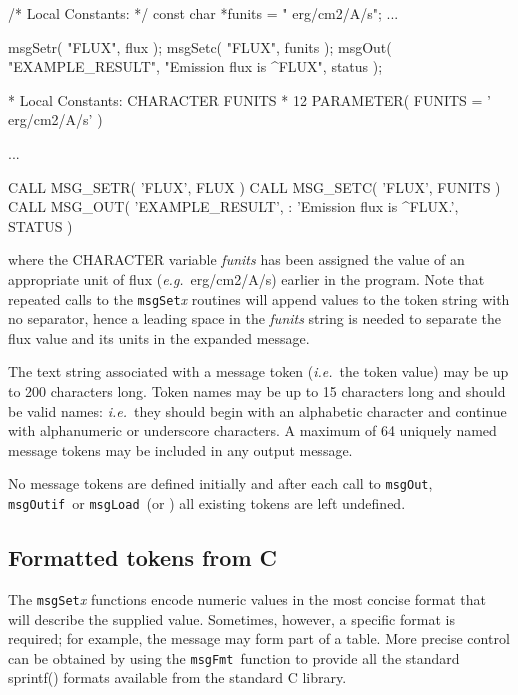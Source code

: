 \documentclass[twoside,11pt]{starlink}
\providecommand{\func}[1]{\texttt{#1}}
\providecommand{\farg}[1]{\textit{#1}}
\providecommand{\msgfmt}{\func{msgFmt}}
\providecommand{\msgload}{\func{msgLoad}}
\providecommand{\msgout}{\func{msgOut}}
\providecommand{\msgoutif}{\func{msgOutif}}
\begin{document}
\begin {small}
\begin{terminalv}
/* Local Constants: */
      const char *funits = " erg/cm2/A/s";
      ...

      msgSetr( "FLUX", flux );
      msgSetc( "FLUX", funits );
      msgOut( "EXAMPLE_RESULT",
              "Emission flux is ^FLUX", status );

*  Local Constants:
      CHARACTER FUNITS * 12
      PARAMETER( FUNITS = ' erg/cm2/A/s' )

      ...

      CALL MSG_SETR( 'FLUX', FLUX )
      CALL MSG_SETC( 'FLUX', FUNITS )
      CALL MSG_OUT( 'EXAMPLE_RESULT',
     :             'Emission flux is ^FLUX.', STATUS )
\end{terminalv}
\end {small}

where the CHARACTER variable \farg{funits} has been assigned the value of an
appropriate unit of flux (\textit{e.g.}\ erg/cm2/A/s) earlier in the program.
Note that repeated calls to the \func{msgSet}\textit{x} routines will append values
to the token string with no separator, hence a leading space in the \farg{funits}
string is needed to separate the flux value and its units in the expanded
message.

The text string associated with a message token (\textit{i.e.}\ the token value)
may be up to 200 characters long.
Token names may be up to 15 characters long and should be valid names:
\textit{i.e.}\ they should begin with an alphabetic character and continue with
alphanumeric or underscore characters.
A maximum of 64 uniquely named message tokens may be included in any output
message.

No message tokens are defined initially and
after each call to \msgout, \msgoutif\ or \msgload\ (or
)
all existing tokens are left undefined.

\subsection{Formatted tokens from C}

The \func{msgSet}\textit{x} functions encode numeric values in the
most concise format that will describe the supplied value.
Sometimes, however, a specific format is required; for example, the message
may form part of a table.  More precise control can be obtained by
using the \msgfmt\ function to provide all the standard sprintf()
formats available from the standard C library.
\end{document}
